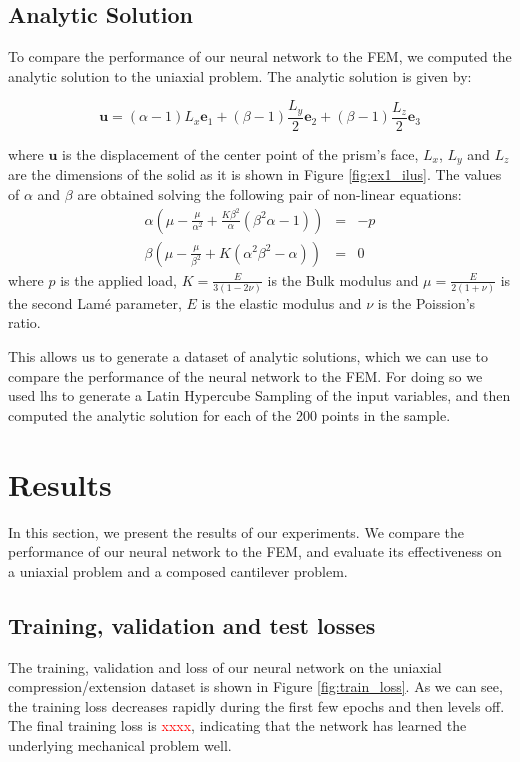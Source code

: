 \documentclass[11pt]{scrartcl} %
\begin{document}
\subsection{Analytic Solution}
To compare the performance of our neural network to the FEM, we computed the analytic solution to the uniaxial problem. The analytic solution is given by:

\begin{equation}
\label{eq:analytic_solution}
\boldsymbol{u} = 
(\alpha - 1)L_x \boldsymbol{e}_1 
+   
(\beta - 1) \frac{L_y}{2}  \boldsymbol{e}_2 
+   
(\beta - 1)\frac{L_z}{2} \boldsymbol{e}_3 
\end{equation}

where $\boldsymbol{u}$ is the displacement of the center point of the prism's face, $L_x$, $L_y$ and $L_z$ are the dimensions of the solid as it is shown in Figure \ref{fig:ex1_ilus}. The values of $\alpha$ and $\beta$ are obtained solving the following pair of non-linear equations:
%
\begin{eqnarray}
\alpha \left( 
\mu -  \frac{\mu}{\alpha^2} + \frac{K\beta^2}{\alpha} (\beta^2 \alpha -1)  
\right) &=& - p \\
\beta \left( 
	\mu -  \frac{\mu}{\beta^2} + K (\alpha^2\beta^2 - \alpha) 
 \right) &=& 0
\end{eqnarray}
%
where  $p$ is the applied load, $K = \frac{E}{3(1 - 2\nu)}$ is the Bulk modulus and $\mu = \frac{E}{2(1 + \nu)}$ is the second Lamé parameter, $E$ is the elastic modulus and $\nu$ is the Poission's ratio. 



This allows us to generate a dataset of analytic solutions, which we can use to compare the performance of the neural network to the FEM. For doing so we used lhs to generate a Latin Hypercube Sampling of the input variables, and then computed the analytic solution for each of the 200 points in the sample.


\section{Results}
In this section, we present the results of our experiments. We compare the performance of our neural network to the FEM, and evaluate its effectiveness on a uniaxial problem and a composed cantilever problem.

\subsection{Training, validation and test losses}
The training, validation and  loss of our neural network on the uniaxial compression/extension dataset is shown in Figure \ref{fig:train_loss}. As we can see, the training loss decreases rapidly during the first few epochs and then levels off. The final training loss is \textcolor{red}{xxxx}, indicating that the network has learned the underlying mechanical problem well.
\end{document}
